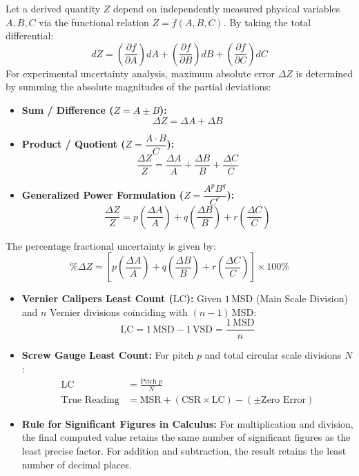 \documentclass[10pt,twoside,openright]{book}
\begin{document}
\begin{formulabox}
Let a derived quantity $Z$ depend on independently measured physical variables $A, B, C$ via the functional relation $Z = f(A, B, C)$. By taking the total differential:
\begin{equation}
  dZ = \left(\frac{\partial f}{\partial A}\right) dA + \left(\frac{\partial f}{\partial B}\right) dB + \left(\frac{\partial f}{\partial C}\right) dC
\end{equation}
For experimental uncertainty analysis, maximum absolute error $\Delta Z$ is determined by summing the absolute magnitudes of the partial deviations:
\begin{itemize}[leftmargin=1.2em, itemsep=2pt]
  \item \textbf{Sum / Difference ($Z = A \pm B$):}
  \[
    \Delta Z = \Delta A + \Delta B
  \]
  \item \textbf{Product / Quotient ($Z = \dfrac{A \cdot B}{C}$):}
  \[
    \frac{\Delta Z}{Z} = \frac{\Delta A}{A} + \frac{\Delta B}{B} + \frac{\Delta C}{C}
  \]
  \item \textbf{Generalized Power Formulation ($Z = \dfrac{A^p B^q}{C^r}$):}
  \[
    \frac{\Delta Z}{Z} = p\left(\frac{\Delta A}{A}\right) + q\left(\frac{\Delta B}{B}\right) + r\left(\frac{\Delta C}{C}\right)
  \]
\end{itemize}
The percentage fractional uncertainty is given by:
\begin{equation}
  \% \Delta Z = \left[ p\left(\frac{\Delta A}{A}\right) + q\left(\frac{\Delta B}{B}\right) + r\left(\frac{\Delta C}{C}\right) \right] \times 100\%
\end{equation}
\end{formulabox}

\begin{usecasebox}
\begin{itemize}
  \item \textbf{Vernier Calipers Least Count ($\mathrm{LC}$):} Given $1\,\mathrm{MSD}$ (Main Scale Division) and $n$ Vernier divisions coinciding with $(n-1)\,\mathrm{MSD}$:
  \begin{equation}
    \mathrm{LC} = 1\,\mathrm{MSD} - 1\,\mathrm{VSD} = \frac{1\,\mathrm{MSD}}{n}
  \end{equation}
  \item \textbf{Screw Gauge Least Count:} For pitch $p$ and total circular scale divisions $N$:
  \begin{align}
    \mathrm{LC} &= \frac{\text{Pitch } p}{N} \\
    \text{True Reading} &= \text{MSR} + (\text{CSR} \times \mathrm{LC}) - (\pm \text{Zero Error})
  \end{align}
  \item \textbf{Rule for Significant Figures in Calculus:} For multiplication and division, the final computed value retains the same number of significant figures as the least precise factor. For addition and subtraction, the result retains the least number of decimal places.
\end{itemize}
\end{usecasebox}
\end{document}
